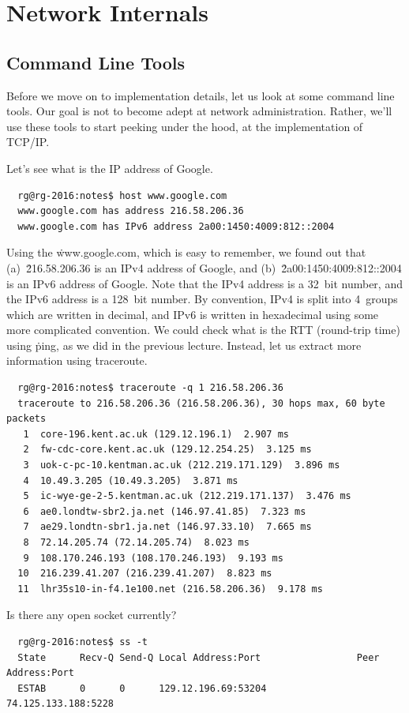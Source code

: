 \chapter{Network Internals}\label{ch:07-net-impl}

\section{Command Line Tools}

Before we move on to implementation details,
  let us look at some command line tools.
Our goal is not to become adept at network administration.
Rather, we'll use these tools to start peeking under the hood,
  at the implementation of TCP/IP\null.

Let's see what is the IP address of Google.
{\footnotesize
\begin{verbatim}
  rg@rg-2016:notes$ host www.google.com
  www.google.com has address 216.58.206.36
  www.google.com has IPv6 address 2a00:1450:4009:812::2004
\end{verbatim}
}\noindent
Using the  \.{www.google.com},
  which is easy to remember,
  we found out that
    (a)~\.{216.58.206.36} is an IPv4 address of Google, and
    (b)~\.{2a00:1450:4009:812::2004} is an IPv6 address of Google.
Note that the IPv4 address is a 32~bit number,
  and the IPv6 address is a 128~bit number.
By convention,
  IPv4 is split into 4~groups which are written in decimal,
  and IPv6 is written in hexadecimal using some more complicated convention.
We could check what is the RTT (round-trip time) using \.{ping},
  as we did in the previous lecture.
Instead, let us extract more information using \.{traceroute}.
{\footnotesize
\begin{verbatim}
  rg@rg-2016:notes$ traceroute -q 1 216.58.206.36
  traceroute to 216.58.206.36 (216.58.206.36), 30 hops max, 60 byte packets
   1  core-196.kent.ac.uk (129.12.196.1)  2.907 ms
   2  fw-cdc-core.kent.ac.uk (129.12.254.25)  3.125 ms
   3  uok-c-pc-10.kentman.ac.uk (212.219.171.129)  3.896 ms
   4  10.49.3.205 (10.49.3.205)  3.871 ms
   5  ic-wye-ge-2-5.kentman.ac.uk (212.219.171.137)  3.476 ms
   6  ae0.londtw-sbr2.ja.net (146.97.41.85)  7.323 ms
   7  ae29.londtn-sbr1.ja.net (146.97.33.10)  7.665 ms
   8  72.14.205.74 (72.14.205.74)  8.023 ms
   9  108.170.246.193 (108.170.246.193)  9.193 ms
  10  216.239.41.207 (216.239.41.207)  8.823 ms
  11  lhr35s10-in-f4.1e100.net (216.58.206.36)  9.178 ms
\end{verbatim}
}\noindent
Is there any open socket currently?
{\footnotesize
\begin{verbatim}
  rg@rg-2016:notes$ ss -t
  State      Recv-Q Send-Q Local Address:Port                 Peer Address:Port                
  ESTAB      0      0      129.12.196.69:53204                74.125.133.188:5228  
\end{verbatim}
}\noindent
